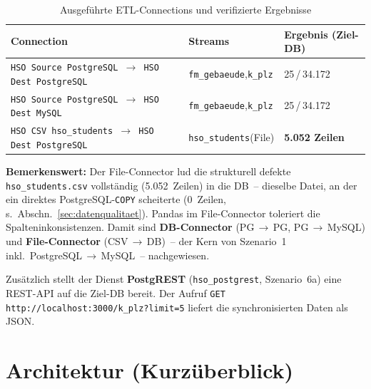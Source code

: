 \documentclass[a4paper,12pt]{article}
\newcommand{\done}{\textcolor{statusGreen}{\ding{52}}}      %
\begin{document}
\begin{table}[H]
    \caption{Ausgeführte ETL-Connections und verifizierte Ergebnisse}
    \centering\small
    \begin{tabular}{@{}L{6.8cm}C{2.8cm}C{3.1cm}@{}}
        \toprule
        \textbf{Connection} & \textbf{Streams} & \textbf{Ergebnis (Ziel-DB)} \\
        \midrule
        \texttt{HSO Source PostgreSQL\,$\rightarrow$\,HSO Dest PostgreSQL} &
            \texttt{fm\_gebaeude},\newline\texttt{k\_plz} &
            25\,/\,34.172~\done \\
        \addlinespace[4pt]
        \texttt{HSO Source PostgreSQL\,$\rightarrow$\,HSO Dest MySQL} &
            \texttt{fm\_gebaeude},\newline\texttt{k\_plz} &
            25\,/\,34.172~\done \\
        \addlinespace[4pt]
        \texttt{HSO CSV hso\_students\,$\rightarrow$\,HSO Dest PostgreSQL} &
            \texttt{hso\_students}\newline(File) &
            \textbf{5.052 Zeilen}~\done \\
        \bottomrule
    \end{tabular}
\end{table}
 
\textbf{Bemerkenswert:} Der File-Connector lud die strukturell defekte
\texttt{hso\_students.csv} vollständig (5.052~Zeilen) in die DB~-- dieselbe Datei, an
der ein direktes PostgreSQL-\texttt{COPY} scheiterte (0~Zeilen,
s.\ Abschn.~\ref{sec:datenqualitaet}). Pandas im File-Connector toleriert die
Spalteninkonsistenzen. Damit sind \textbf{DB-Connector} (PG\,$\rightarrow$\,PG,
PG\,$\rightarrow$\,MySQL) und \textbf{File-Connector} (CSV\,$\rightarrow$\,DB)~-- der
Kern von Szenario~1 inkl.\ \glqq{}PostgreSQL\,$\rightarrow$\,MySQL\grqq{}~-- nachgewiesen.
 
Zusätzlich stellt der Dienst \textbf{PostgREST} (\texttt{hso\_postgrest}, Szenario~6a)
eine REST-API auf die Ziel-DB bereit. Der Aufruf
\texttt{GET http://localhost:3000/k\_plz?limit=5} liefert die synchronisierten Daten als JSON.
 
\section{Architektur (Kurzüberblick)}
 
\end{document}
